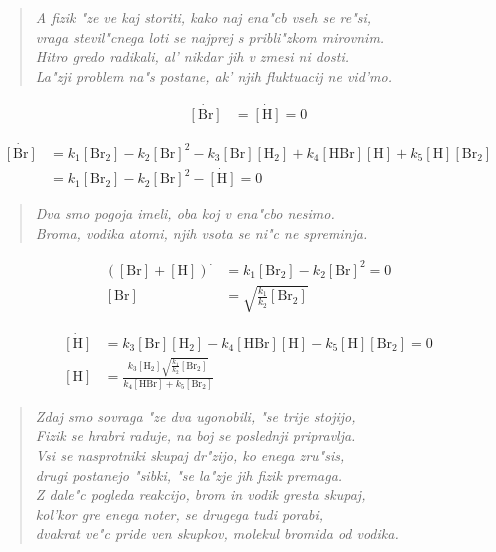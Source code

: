 \documentclass[a4paper,10pt]{article}
\newcommand{\HH}{\ensuremath{[\mathrm{H_2}]}}
\newcommand{\BBr}{\ensuremath{[\mathrm{Br_2}]}}
\newcommand{\HBr}{\ensuremath{[\mathrm{HBr}]}}
\begin{document}
\begin{verse}
\textit{A fizik "ze ve kaj storiti, kako naj ena"cb vseh se re"si, \\
vraga stevil"cnega loti se najprej s pribli"zkom mirovnim. \\
Hitro gredo radikali, al' nikdar jih v zmesi ni dosti. \\
La"zji problem na"s postane, ak' njih fluktuacij ne vid'mo. 
}
\end{verse}

\begin{align}
 \dot{[\mathrm{Br}]} &= \dot{[\mathrm{H}]} = 0
\end{align}

\begin{align}
 \dot{[\mathrm{Br}]} &= k_1 [\mathrm{Br_2}] - k_2 [\mathrm{Br}]^2 - k_3 [\mathrm{Br}] [\mathrm{H_2}] + k_4 [\mathrm{HBr}] [\mathrm{H}] + k_5 [\mathrm{H}] [\mathrm{Br_2}]  \\
  &= k_1 [\mathrm{Br_2}] - k_2 [\mathrm{Br}]^2 - \dot{[\mathrm{H}]} = 0
\end{align}

\begin{verse}
\textit{Dva smo pogoja imeli, oba koj v ena"cbo nesimo. \\
Broma, vodika atomi, njih vsota se ni"c ne spreminja. }
\end{verse}

\begin{align}
 ([\mathrm{Br}] + [\mathrm{H}])^\cdot &= k_1 [\mathrm{Br_2}] - k_2 [\mathrm{Br}]^2  = 0 \\
 [\mathrm{Br}] &= \sqrt{\frac{k_1}{k_2}\BBr}
\end{align}

\begin{align}
  \dot{[\mathrm{H}]} &= k_3 [\mathrm{Br}] [\mathrm{H_2}] - k_4 [\mathrm{HBr}] [\mathrm{H}] - k_5 [\mathrm{H}] [\mathrm{Br_2}] = 0\\
  [\mathrm{H}] &= \frac{k_3 \HH \sqrt{\frac{k_1}{k_2}\BBr} }{k_4 \HBr + k_5 \BBr}
\end{align}

\begin{verse}
 \textit{Zdaj smo sovraga "ze dva ugonobili, "se trije stojijo, \\
Fizik se hrabri raduje, na boj se poslednji pripravlja. \\
Vsi se nasprotniki skupaj dr"zijo, ko enega zru"sis, \\
drugi postanejo "sibki, "se la"zje jih fizik premaga. \\
Z dale"c pogleda reakcijo, brom in vodik gresta skupaj, \\
kol'kor gre enega noter, se drugega tudi porabi, \\
dvakrat ve"c pride ven skupkov, molekul bromida od vodika. 
}
\end{verse}
\end{document}
